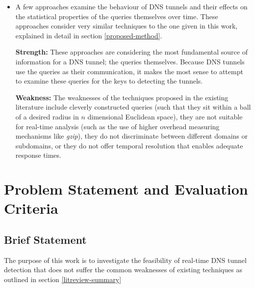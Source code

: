 \documentclass[12pt]{report}
\theoremstyle{remark}
\theoremstyle{definition}
\theoremstyle{definition}
\theoremstyle{definition}
\begin{document}
\begin{itemize}
\item A few approaches examine the behaviour of DNS tunnels and their effects on
the statistical properties of the queries themselves over time. These approaches
consider very similar techniques to the one given in this work, explained in
detail in section \ref{proposed-method}.

\textbf{Strength:} These approaches are considering the most fundamental source
of information for a DNS tunnel; the queries themselves. Because DNS tunnels use
the queries as their communication, it makes the most sense to attempt to
examine these queries for the keys to detecting the tunnels.

\textbf{Weakness:} The weaknesses of the techniques proposed in the existing
literature include cleverly constructed queries (such that they sit within a
ball of a desired radius in $n$ dimensional Euclidean space), they are not
suitable for real-time analysis (such as the use of higher overhead measuring
mechanisms like \emph{gzip}), they do not discriminate between different domains
or subdomains, or they do not offer temporal resolution that enables adequate 
response times.
\end{itemize}

\newpage
\chapter{Problem Statement and Evaluation Criteria}

\section{Brief Statement}
\label{briefproblem}
The purpose of this work is to
investigate the feasibility of real-time DNS tunnel detection that does not
suffer the common weaknesses of existing techniques as outlined in section
\ref{litreview-summary}
\end{document}
